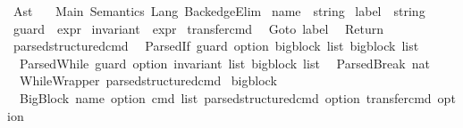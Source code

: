 %
\begin{isabellebody}%
%
%
\isadelimdocument
%
\endisadelimdocument
%
\isatagdocument
%
\isamarkuptrue%
%
\endisatagdocument
{\isafolddocument}%
%
\isadelimdocument
%
\endisadelimdocument
%
\isadelimtheory
%
\endisadelimtheory
%
\isatagtheory
{}\isamarkupfalse%
\ Ast\isanewline
\ \ \ Main\ Semantics\ Lang\ BackedgeElim\isanewline
{}%
\endisatagtheory
{\isafoldtheory}%
%
\isadelimtheory
%
\endisadelimtheory
%
\isadelimdocument
%
\endisadelimdocument
%
\isatagdocument
%
\isamarkuptrue%
%
\endisatagdocument
{\isafolddocument}%
%
\isadelimdocument
%
\endisadelimdocument
{}\isamarkupfalse%
\ name\ {\isacharequal}{\kern0pt}\ string\isanewline
{}\isamarkupfalse%
\ label\ {\isacharequal}{\kern0pt}\ string\isanewline
{}\isamarkupfalse%
\ guard\ {\isacharequal}{\kern0pt}\ expr\isanewline
{}\isamarkupfalse%
\ invariant\ {\isacharequal}{\kern0pt}\ expr\isanewline
\isanewline
{}\isamarkupfalse%
\ transfer{\isacharunderscore}{\kern0pt}cmd\isanewline
\ {\isacharequal}{\kern0pt}\ Goto\ label\isanewline
\ {\isacharbar}{\kern0pt}\ Return\isanewline
\isanewline
{}\isamarkupfalse%
\ parsed{\isacharunderscore}{\kern0pt}structured{\isacharunderscore}{\kern0pt}cmd\isanewline
\ {\isacharequal}{\kern0pt}\ ParsedIf\ {\isachardoublequoteopen}guard\ option{\isachardoublequoteclose}\ {\isachardoublequoteopen}bigblock\ list{\isachardoublequoteclose}\ {\isachardoublequoteopen}bigblock\ list{\isachardoublequoteclose}\isanewline
\ {\isacharbar}{\kern0pt}\ ParsedWhile\ {\isachardoublequoteopen}guard\ option{\isachardoublequoteclose}\ {\isachardoublequoteopen}invariant\ list{\isachardoublequoteclose}\ {\isachardoublequoteopen}bigblock\ list{\isachardoublequoteclose}\isanewline
\ {\isacharbar}{\kern0pt}\ ParsedBreak\ nat\isanewline
\ {\isacharbar}{\kern0pt}\ WhileWrapper\ parsed{\isacharunderscore}{\kern0pt}structured{\isacharunderscore}{\kern0pt}cmd\isanewline
\isanewline
{}\ bigblock\ \isanewline
\ {\isacharequal}{\kern0pt}\ BigBlock\ {\isachardoublequoteopen}name\ option{\isachardoublequoteclose}\ {\isachardoublequoteopen}cmd\ list{\isachardoublequoteclose}\ {\isachardoublequoteopen}parsed{\isacharunderscore}{\kern0pt}structured{\isacharunderscore}{\kern0pt}cmd\ option{\isachardoublequoteclose}\ {\isachardoublequoteopen}transfer{\isacharunderscore}{\kern0pt}cmd\ option{\isachardoublequoteclose}%

\end{isabellebody}
